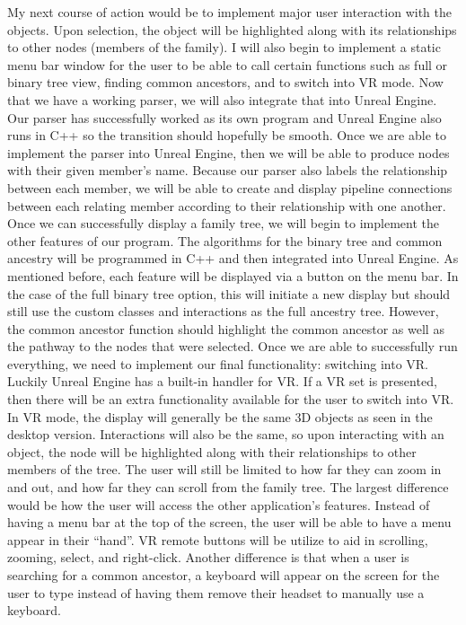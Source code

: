 \documentclass[onecolumn, draftclsnofoot, 10pt, compsoc]{IEEEtran}
\begin{document}
\begin{singlespace}
My next course of action would be to implement major user interaction with the objects. Upon selection, the object will be highlighted along with its relationships to other nodes (members of the family). I will also begin to implement a static menu bar window for the user to be able to call certain functions such as full or binary tree view, finding common ancestors, and to switch into VR mode.
Now that we have a working parser, we will also integrate that into Unreal Engine. Our parser has successfully worked as its own program and Unreal Engine also runs in C++ so the transition should hopefully be smooth. Once we are able to implement the parser into Unreal Engine, then we will be able to produce nodes with their given member's name. Because our parser also labels the relationship between each member, we will be able to create and display pipeline connections between each relating member according to their relationship with one another. 
Once we can successfully display a family tree, we will begin to implement the other features of our program. The algorithms for the binary tree and common ancestry will be programmed in C++ and then integrated into Unreal Engine. As mentioned before, each feature will be displayed via a button on the menu bar. In the case of the full binary tree option, this will initiate a new display but should still use the custom classes and interactions as the full ancestry tree. However, the common ancestor function should highlight the common ancestor as well as the pathway to the nodes that were selected. 
Once we are able to successfully run everything, we need to implement our final functionality: switching into VR. Luckily Unreal Engine has a built-in handler for VR. If a VR set is presented, then there will be an extra functionality available for the user to switch into VR. In VR mode, the display will generally be the same 3D objects as seen in the desktop version. Interactions will also be the same, so upon interacting with an object, the node will be highlighted along with their relationships to other members of the tree. The user will still be limited to how far they can zoom in and out, and how far they can scroll from the family tree. The largest difference would be how the user will access the other application's features. Instead of having a menu bar at the top of the screen, the user will be able to have a menu appear in their “hand”. VR remote buttons will be utilize to aid in scrolling, zooming, select, and right-click. Another difference is that when a user is searching for a common ancestor, a keyboard will appear on the screen for the user to type instead of having them remove their headset to manually use a keyboard.

\end{singlespace}
\end{document}
